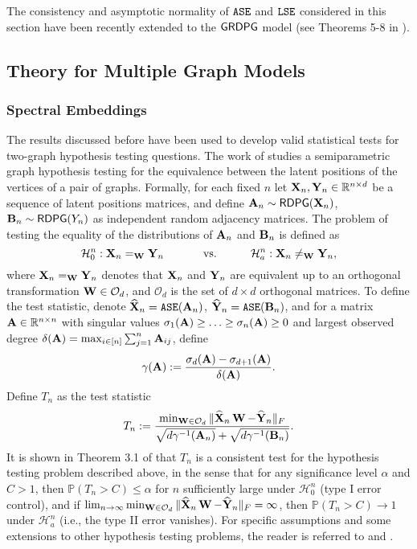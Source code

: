 The consistency and asymptotic normality of  $\operatorname{\mathtt{ASE}}$ and $\operatorname{\mathtt{LSE}}$ considered in this section  have been recently extended to the $\operatorname{\mathsf{GRDPG}}$ model  (see Theorems 5-8 in  \cite{rubin2017statistical}). 



\subsection{Theory for Multiple Graph Models}

\subsubsection{Spectral Embeddings}\label{sec:theory_multi}

The results discussed before have been used to develop valid statistical tests for   two-graph hypothesis testing questions. The work of \cite{tang2017semiparametric} studies a semiparametric graph hypothesis testing for the equivalence between the latent positions of the vertices of a pair of graphs. Formally, for each fixed $n$ let $\operatorname{\mathbf{X}}_n, \operatorname{\mathbf{Y}}_n\in\mathbb{R}^{n\times d}$ be a sequence of latent positions matrices, and define
$\operatorname{\mathbf{A}}_n\sim\operatorname{\mathsf{RDPG}}(\operatorname{\mathbf{X}}_n)$, $\operatorname{\mathbf{B}}_n\sim\operatorname{\mathsf{RDPG}}(Y_n)$ as independent random adjacency matrices. The problem of testing the equality of the distributions of $\operatorname{\mathbf{A}}_n$ and $\operatorname{\mathbf{B}}_n$  is defined as
\begin{equation*}
    \mathcal{H}^n_0:\operatorname{\mathbf{X}}_n =_{\operatorname{\mathbf{W}}} \operatorname{\mathbf{Y}}_n\quad\quad\quad \text{ vs.}\quad\quad\quad \mathcal{H}^n_a:\operatorname{\mathbf{X}}_n \neq_{\operatorname{\mathbf{W}}} \operatorname{\mathbf{Y}}_n,
\end{equation*}
where $\operatorname{\mathbf{X}}_n =_{\operatorname{\mathbf{W}}}\operatorname{\mathbf{Y}}_n$ denotes that $\operatorname{\mathbf{X}}_n$ and $\operatorname{\mathbf{Y}}_n$ are equivalent up to an orthogonal transformation $\operatorname{\mathbf{W}}\in\mathcal{O}_d$, and $\mathcal{O}_d$ is the set of $d\times d$ orthogonal matrices. To define the test statistic, denote  $\widehat{\operatorname{\mathbf{X}}}_n = \operatorname{\mathtt{ASE}}(\operatorname{\mathbf{A}}_n)$, $\widehat{\operatorname{\mathbf{Y}}}_n=\operatorname{\mathtt{ASE}}(\operatorname{\mathbf{B}}_n)$, and for a matrix $\operatorname{\mathbf{A}}\in\mathbb{R}^{n\times n}$ with singular values $\sigma_1(\operatorname{\mathbf{A}}) \geq \ldots\geq \sigma_n(\operatorname{\mathbf{A}})\geq 0$ and largest observed degree $\delta(\operatorname{\mathbf{A}}) = \max_{i\in[n]}\sum_{j=1}^n\operatorname{\mathbf{A}}_{ij}$, define 
$$\gamma(\operatorname{\mathbf{A}}):=\frac{\sigma_d(\operatorname{\mathbf{A}}) - \sigma_{d+1}(\operatorname{\mathbf{A}})}{\delta(\operatorname{\mathbf{A}})}.$$ 
Define $T_n$ as the test statistic
\begin{equation*}
    T_n : = \frac{\min_{\operatorname{\mathbf{W}}\in\mathcal{O}_d} \|\widehat{\operatorname{\mathbf{X}}}_n\operatorname{\mathbf{W}} - \widehat{\operatorname{\mathbf{Y}}}_n\|_F}{\sqrt{d\gamma^{-1}(\operatorname{\mathbf{A}}_n)} + \sqrt{d\gamma^{-1}(\operatorname{\mathbf{B}}_n)}}.
\end{equation*}
It is shown in Theorem 3.1 of \cite{tang2017semiparametric} that  $T_n$ is a consistent test for the  hypothesis testing problem described above, in the sense that for any significance level $\alpha$ and $C>1$, then  $\mathbb{P}(T_n> C)\leq \alpha$ for $n$ sufficiently large under $\mathcal{H}^n_0$ (type I error control), and if $\lim_{n\rightarrow\infty}\min_{\operatorname{\mathbf{W}}\in\mathcal{O}_d} \|\widehat{\operatorname{\mathbf{X}}}_n\operatorname{\mathbf{W}} - \widehat{\operatorname{\mathbf{Y}}}_n\|_F=\infty$, then $\mathbb{P}(T_n> C)\rightarrow 1$ under $\mathcal{H}^n_a$ (i.e., the type II error vanishes). For specific assumptions and some extensions to other hypothesis testing problems, the reader is referred to \cite{tang2017semiparametric} and \cite{athreya2017statistical}.

